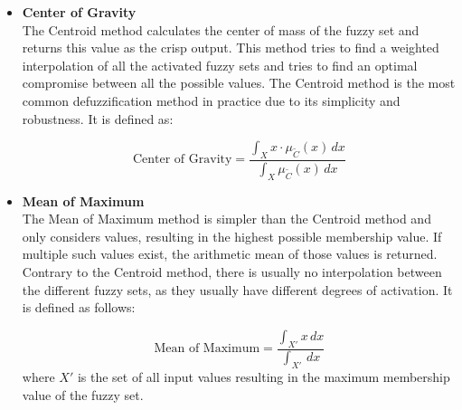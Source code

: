 \begin{itemize}
      \item \textbf{Center of Gravity} \\
            The Centroid method calculates the center of mass of the fuzzy set and returns this value as the crisp output. This method tries to find a weighted interpolation of all the activated fuzzy sets and tries to find an optimal compromise between all the possible values. The Centroid method is the most common defuzzification method in practice due to its simplicity and robustness. It is defined as:

            \begin{equation}
                  \text{Center of Gravity} = \frac{\int_X x \cdot \mu_{\tilde{C}}(x) \, dx}{\int_X \mu_{\tilde{C}}(x) \, dx}
            \end{equation}

      \item \textbf{Mean of Maximum} \\
            The Mean of Maximum method is simpler than the Centroid method and only considers values, resulting in the highest possible membership value. If multiple such values exist, the arithmetic mean of those values is returned. Contrary to the Centroid method, there is usually no interpolation between the different fuzzy sets, as they usually have different degrees of activation. It is defined as follows:

            \begin{equation}
                  \text{Mean of Maximum} = \frac{\int_{X'} x \, dx}{\int_{X'}  \, dx}
            \end{equation}
            where $X'$ is the set of all input values resulting in the maximum membership value of the fuzzy set.
\end{itemize}


